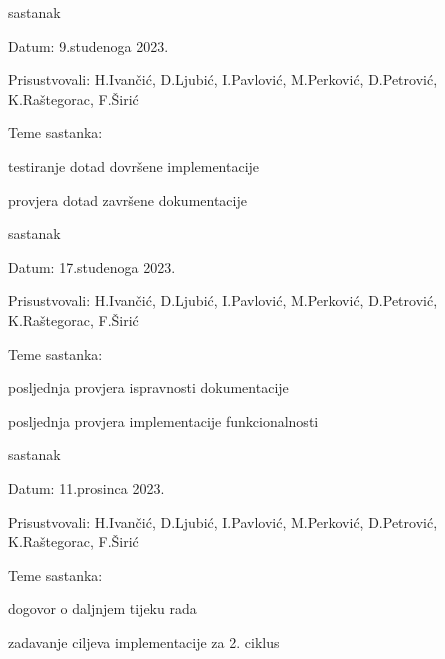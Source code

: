 \begin{packed_enum}
			\item  sastanak
			\item[] \begin{packed_item}
				\item Datum: 9.studenoga 2023.
				\item Prisustvovali: H.Ivančić, D.Ljubić, I.Pavlović, M.Perković, D.Petrović, K.Raštegorac, F.Širić
				\item Teme sastanka:
				\begin{packed_item}
					\item  testiranje dotad dovršene implementacije
					\item  provjera dotad završene dokumentacije
				\end{packed_item}
			\end{packed_item}
			
			\item  sastanak
			\item[] \begin{packed_item}
				\item Datum: 17.studenoga 2023.
				\item Prisustvovali: H.Ivančić, D.Ljubić, I.Pavlović, M.Perković, D.Petrović, K.Raštegorac, F.Širić
				\item Teme sastanka:
				\begin{packed_item}
					\item  posljednja provjera ispravnosti dokumentacije
					\item  posljednja provjera implementacije funkcionalnosti
				\end{packed_item}
			\end{packed_item}
			
			\item  sastanak
			\item[] \begin{packed_item}
				\item Datum: 11.prosinca 2023.
				\item Prisustvovali: H.Ivančić, D.Ljubić, I.Pavlović, M.Perković, D.Petrović, K.Raštegorac, F.Širić
				\item Teme sastanka:
				\begin{packed_item}
					\item  dogovor o daljnjem tijeku rada
					\item zadavanje ciljeva implementacije za 2. ciklus
				\end{packed_item}
			\end{packed_item}
			

\end{packed_enum}
